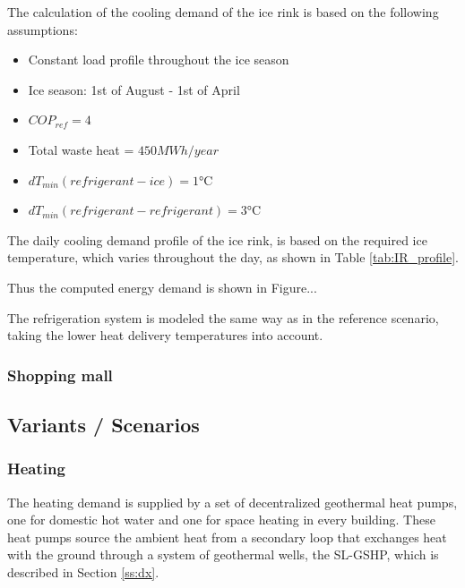 \documentclass{article}
\begin{document}
The calculation of the cooling demand of the ice rink is based on the following assumptions:
\begin{itemize}
	\item Constant load profile throughout the ice season
	\item Ice season: 1st of August - 1st of April
	\item $COP_{ref} = 4$ \cite{karampourMEASUREMENTMODELLINGICE}
	\item Total waste heat = $ 450 MWh/year$ \cite{kolasniewskiEvaluationModellingIce}
	\item $dT_{min}(refrigerant-ice) = 1 \si{\celsius}$
	\item $dT_{min}(refrigerant-refrigerant) = 3 \si{\celsius}$
\end{itemize}

The daily cooling demand profile of the ice rink, is based on the required ice temperature, which varies throughout the day\cite{karampourMEASUREMENTMODELLINGICE}, as shown in Table \ref{tab:IR_profile}.



Thus the computed energy demand is shown in Figure...


The refrigeration system is modeled the same way as in the reference scenario, taking the lower heat delivery temperatures into account.

\subsubsection{Shopping mall}

\subsection{Variants / Scenarios}

\subsubsection{Heating}
The heating demand is supplied by a set of decentralized geothermal heat pumps, one for domestic hot water and one for space heating in every building. These heat pumps source the ambient heat from a secondary loop that exchanges heat with the ground through a system of geothermal wells, the SL-GSHP, which is described in Section \ref{ss:dx}. 
\end{document}
